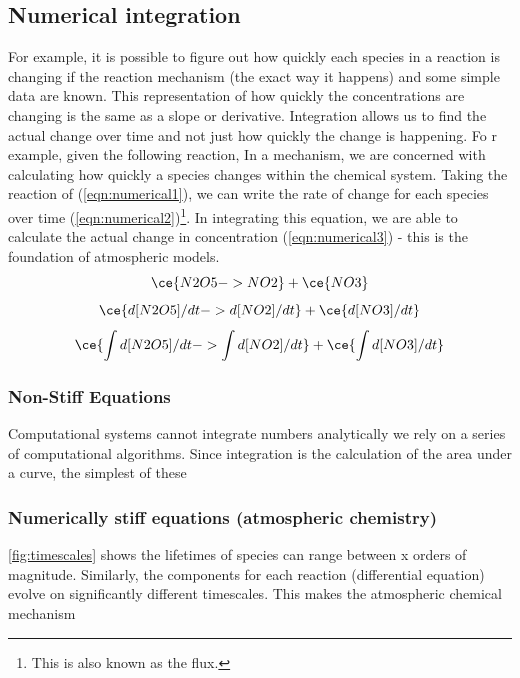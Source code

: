 \subsection{Numerical integration}
For example, it is possible to figure out how quickly each species in a reaction is changing if the reaction mechanism (the exact way it happens) and some simple data are known. This representation of how quickly the concentrations are changing is the same as a slope or derivative. Integration allows us to find the actual change over time and not just how quickly the change is happening. Fo r example, given the following reaction,
In a mechanism, we are concerned with calculating how quickly a species changes within the chemical system. Taking the reaction of  (\autoref{eqn:numerical1}), we can write the rate of change for each species over time (\autoref{eqn:numerical2})\footnote{This is also known as the flux.}. In integrating this equation, we are able to calculate the actual change in concentration (\autoref{eqn:numerical3}) - this is the foundation of atmospheric models.
\begin{equation}
\ce{N2O5 ->    NO2} + \ce{NO3}
\label{eqn:numerical1}
\end{equation}
\begin{equation}
\ce{ d[N2O5]/dt ->    d[NO2]/dt} + \ce{d[NO3]/dt}
\label{eqn:numerical2}
\end{equation}
\begin{equation}
\ce{ \int d[N2O5]/dt ->    \int d[NO2]/dt} + \ce{\int d[NO3]/dt}
\label{eqn:numerical3}
\end{equation}
\subsubsection{Non-Stiff Equations}
Computational systems cannot integrate numbers analytically we rely on a series of computational algorithms. Since integration is the calculation of the area under a curve, the simplest of these
\subsubsection{Numerically stiff equations (atmospheric chemistry)}
\autoref{fig:timescales} shows the lifetimes of species can range between x orders of magnitude. Similarly, the components for each reaction (differential equation) evolve on significantly different timescales. This makes the atmospheric chemical mechanism
